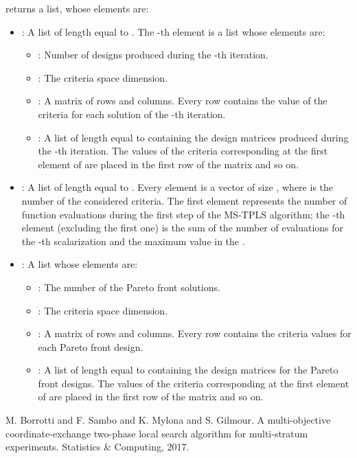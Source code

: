 \documentclass[a4paper]{book}
\begin{document}
\begin{Value}
 returns a list, whose elements are:
\begin{itemize}

\item{} : A list of length equal to . The -th element
is a list whose elements are:
\begin{itemize}

\item{} : Number of designs produced during the -th iteration.
\item{} : The criteria space dimension.
\item{} : A matrix of  rows and  columns.
Every row contains the value of the criteria for each solution of the
-th iteration.
\item{} : A list of length equal to  containing the
design matrices produced during the -th iteration. The values of the
criteria corresponding at the first element of  are placed
in the first row of the  matrix and so on.

\end{itemize}

\item{} : A list of length equal to . Every element is a
vector of size , where  is the number of the
considered criteria. The first element represents the number of function
evaluations during the first step of the MS-TPLS algorithm; the -th
element (excluding the first one) is the sum of the number of evaluations for
the -th scalarization and the maximum value in the .

\item{} : A list whose elements are:
\begin{itemize}

\item{} : The number of the Pareto front solutions.
\item{} : The criteria space dimension.
\item{} : A matrix of  rows and  columns.
Every row contains the criteria values for each Pareto front design.
\item{} : A list of length equal to  containing
the design matrices for the Pareto front designs. The values of the criteria
corresponding at the first element of  are placed in the
first row of the  matrix and so on.

\end{itemize}


\end{itemize}

\end{Value}
%
\begin{References}\relax
M. Borrotti and F. Sambo and K. Mylona and S. Gilmour. A multi-objective
coordinate-exchange two-phase local search algorithm for multi-stratum
experiments. Statistics \& Computing, 2017.
\end{References}
\printindex{}
\end{document}
